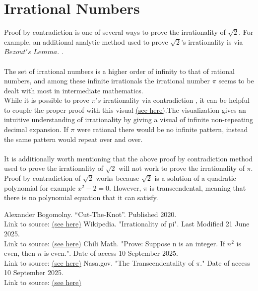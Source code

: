 \documentclass[12pt]{article}
\theoremstyle{plain}
\theoremstyle{definition}
\begin{document}
    \section{Irrational Numbers} \label{sect:irrational}
    
    Proof by contradiction is one of several ways to prove the irrationality of $\sqrt2$. For example, an additional analytic method used to prove $\sqrt2$'s irrationality is via $Bezout's$ $Lemma$.
    \cite{Alexander Bogomolny}. \\\\
    The set of irrational numbers is a higher order of infinity to that of rational numbers, and among these infinite irrationals the irrational number $\pi$ seems to be dealt with most in intermediate mathematics.\\
    While it is possible to prove $\pi's$ irrationality via contradiction \cite{Wikipedia}, it can be helpful to couple the proper proof with this visual \href{https://www.youtube.com/watch?v=YsIlEVeHc4k}{(see here)}.The visualization gives an intuitive understanding of irrationality by giving a visual of infinite non-repeating decimal expansion. If $\pi$ were rational there would be no infinite pattern, instead the same pattern would repeat over and over.\\\\
    It is additionally worth mentioning that the above proof by contradiction method used to prove the irrationality of $\sqrt{2}$ will not work to prove the irrationality of $\pi$.\\
    Proof by contradiction of $\sqrt{2}$ works because $\sqrt{2}$ is a solution of a quadratic polynomial for example $x^2-2=0$. However, $\pi$ is transcendental\cite{Nasa}, meaning that there is no polynomial equation that it can satisfy. 
    

\begin{thebibliography}{100}
         Alexander Bogomolny. ``Cut-The-Knot''. Published 2020.\\ Link to source: \href{https://www.cut-the-knot.org/proofs/FloydSqRt.shtml}{(see here)}
         Wikipedia. "Irrationality of pi". Last Modified 21 June 2025.\\ 
        Link to source: \href{https://en.wikipedia.org/wiki/Proof_that_%CF%80_is_irrational}{(see here)}
         Chili Math. "Prove: Suppose n is an integer. If $n^2$ is even, then $n$ is even.". Date of access 10 September 2025.\\ Link to source: \href{https://www.chilimath.com/lessons/basic-math-proofs/if-n-squared-is-even-then-n-is-even/}{(see  here)}
         Nasa.gov. "The Transcendentality of $\pi$." Date of access 10 September 2025.\\
        Link to source: \href{https://www.grc.nasa.gov/www/k-12/Numbers/Math/Mathematical_Thinking/transcendentality_of_p.htm}{(see here)}
    \end{thebibliography}
\end{document}
